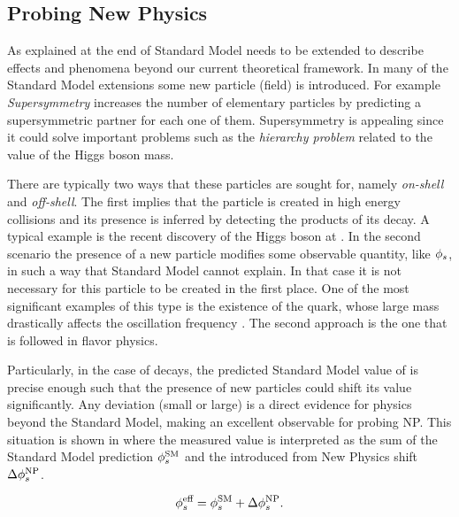 \subsection{Probing New Physics}
\label{probe_new_phys}

As explained at the end of  Standard Model needs to be extended
to describe effects and phenomena beyond our current theoretical framework. In many of the Standard Model
extensions some new particle (field) is introduced. For example {\it Supersymmetry} \cite{Golfand:1971iw,Volkov:1973ix,Wess:1974tw}
increases the number of elementary particles by predicting a supersymmetric partner for each one of them.
Supersymmetry is appealing since it could solve important problems such as the {\it hierarchy problem}
related to the value of the Higgs boson mass.

There are typically two ways that these particles are sought for, namely {\it on-shell} and {\it off-shell}.
The first implies that the particle is created in high energy collisions and its presence is inferred by detecting the products of
its decay. A typical example is the recent discovery of the Higgs boson at \lhc \cite{higgs-cms,higgs-atlas}.
In the second scenario the presence of a new particle modifies some observable quantity, like $\phi_{s}$, in such a way that Standard Model
cannot explain. In that case it is not necessary for this particle to be created in the first place.
One of the most significant examples of this type is the existence of the \tquark quark, whose large mass
drastically affects the \BdBdbarSyst oscillation frequency \cite{argus-bbmix}. The second approach is the one
that is followed in flavor physics.

Particularly, in the case of \BsJpsiPhi decays, the predicted Standard Model value of  is precise enough
such that the presence of new particles could shift its value \cite{Buras:2009if,Chiang:2009ev,Datta:2009fk} significantly.
Any deviation (small or large) is a direct evidence for physics beyond the Standard Model, making \phis an excellent observable for probing NP.
This situation is shown in  where the measured value  is interpreted
as the sum of the Standard Model prediction $\phi_{s}^{\tiny\text{SM}}$ and the introduced from New Physics shift $\Delta\phi_{s}^{\tiny\text{NP}}$.

\begin{equation}
  \centering
 \phis^{\text {eff}} = \phis^{\tiny \text{SM}} + \Delta\phiS{NP}.
 \label{phis_meas}
\end{equation}

